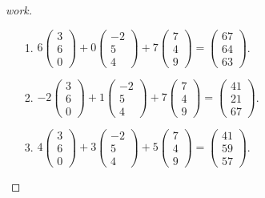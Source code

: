 \documentclass{article}
\begin{document}
\begin{enumerate}
{\begin{enumerate}
\begin{proof}[work]
\begin{enumerate}
          \item[1.] $6\begin{pmatrix}3 \\ 6 \\ 0\end{pmatrix} + 0\begin{pmatrix}-2 \\ 5 \\ 4\end{pmatrix} + 7\begin{pmatrix}7 \\ 4 \\ 9\end{pmatrix} = \begin{pmatrix}67 \\ 64 \\ 63\end{pmatrix}$.
          \item[2.] $-2\begin{pmatrix}3 \\ 6 \\ 0\end{pmatrix} + 1\begin{pmatrix}-2 \\ 5 \\ 4\end{pmatrix} + 7\begin{pmatrix}7 \\ 4 \\ 9\end{pmatrix} = \begin{pmatrix}41 \\ 21 \\ 67\end{pmatrix}$.
          \item[3.] $4\begin{pmatrix}3 \\ 6 \\ 0\end{pmatrix} + 3\begin{pmatrix}-2 \\ 5 \\ 4\end{pmatrix} + 5\begin{pmatrix}7 \\ 4 \\ 9\end{pmatrix} = \begin{pmatrix}41 \\ 59 \\ 57\end{pmatrix}$.

\end{enumerate}
\end{proof}
\end{enumerate}}
\end{enumerate}
\end{document}
